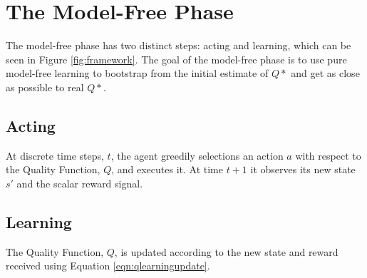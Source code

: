 \section{The Model-Free Phase}
The model-free phase has two distinct steps: acting and learning, which can be seen in Figure \ref{fig:framework}. The goal of the model-free phase is to use pure model-free learning to bootstrap from the initial estimate of $Q*$ and get as close as possible to real $Q*$. 
\subsection{Acting}
At discrete time steps, $t$, the agent greedily selections an action $a$ with respect to the Quality Function, $Q$, and executes it. At time $t+1$ it observes its new state $s'$ and the  scalar reward signal.
\subsection{Learning}
The Quality Function, $Q$, is updated according to the new state and reward received using Equation \ref{eqn:qlearningupdate}.
